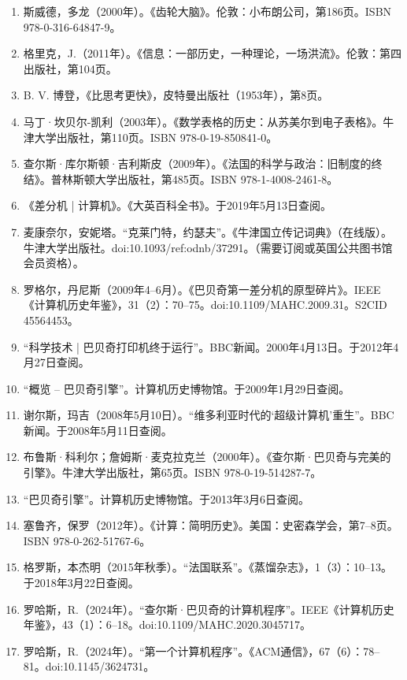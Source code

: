 \begin{enumerate}
\item 斯威德，多龙（2000年）。《齿轮大脑》。伦敦：小布朗公司，第186页。ISBN 978-0-316-64847-9。
\item 格里克，J.（2011年）。《信息：一部历史，一种理论，一场洪流》。伦敦：第四出版社，第104页。
\item B. V. 博登，《比思考更快》，皮特曼出版社（1953年），第8页。
\item 马丁·坎贝尔-凯利（2003年）。《数学表格的历史：从苏美尔到电子表格》。牛津大学出版社，第110页。ISBN 978-0-19-850841-0。
\item 查尔斯·库尔斯顿·吉利斯皮（2009年）。《法国的科学与政治：旧制度的终结》。普林斯顿大学出版社，第485页。ISBN 978-1-4008-2461-8。
\item 《差分机 | 计算机》。《大英百科全书》。于2019年5月13日查阅。
\item 麦康奈尔，安妮塔。“克莱门特，约瑟夫”。《牛津国立传记词典》（在线版）。牛津大学出版社。doi:10.1093/ref:odnb/37291。（需要订阅或英国公共图书馆会员资格）。
\item 罗格尔，丹尼斯（2009年4–6月）。《巴贝奇第一差分机的原型碎片》。IEEE《计算机历史年鉴》，31（2）：70–75。doi:10.1109/MAHC.2009.31。S2CID 45564453。
\item “科学技术 | 巴贝奇打印机终于运行”。BBC新闻。2000年4月13日。于2012年4月27日查阅。
\item “概览 – 巴贝奇引擎”。计算机历史博物馆。于2009年1月29日查阅。
\item 谢尔斯，玛吉（2008年5月10日）。“维多利亚时代的‘超级计算机’重生”。BBC新闻。于2008年5月11日查阅。

\item 布鲁斯·科利尔；詹姆斯·麦克拉克兰（2000年）。《查尔斯·巴贝奇与完美的引擎》。牛津大学出版社，第65页。ISBN 978-0-19-514287-7。

\item “巴贝奇引擎”。计算机历史博物馆。于2013年3月6日查阅。

\item 塞鲁齐，保罗（2012年）。《计算：简明历史》。美国：史密森学会，第7–8页。ISBN 978-0-262-51767-6。

\item 格罗斯，本杰明（2015年秋季）。“法国联系”。《蒸馏杂志》，1（3）：10–13。于2018年3月22日查阅。

\item 罗哈斯，R.（2024年）。“查尔斯·巴贝奇的计算机程序”。IEEE《计算机历史年鉴》，43（1）：6–18。doi:10.1109/MAHC.2020.3045717。

\item 罗哈斯，R.（2024年）。“第一个计算机程序”。《ACM通信》，67（6）：78–81。doi:10.1145/3624731。


\end{enumerate}
